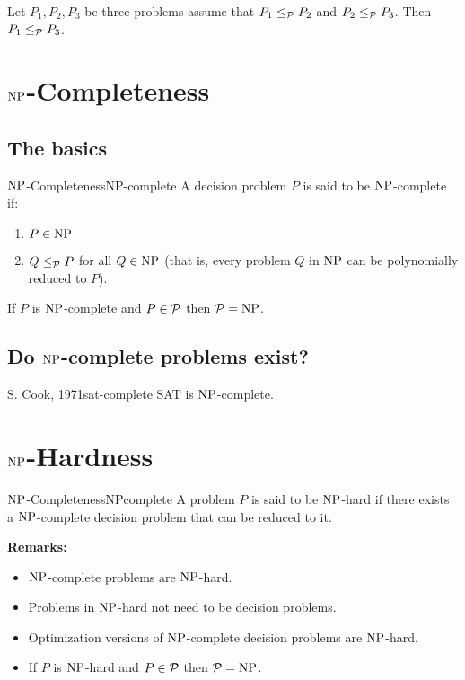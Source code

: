 \begin{proposition}{}{} Let $P_1,P_2,P_3$ be three problems assume that $P_1\leq_{{\mathcal{P}}}P_2$ and $P_2\leq_{{\mathcal{P}}}P_3$. Then $P_1\leq_{{\mathcal{P}}}P_3$.
\end{proposition}

\section{$\mbox{NP}$-Completeness}
\subsection{The basics}
\begin{definition}{$\mbox{NP}$-Completeness}{NP-complete}
A decision problem $P$ is said to be $\mbox{NP}$-complete if:
\begin{enumerate}
	\item $P\in \mbox{NP}$
	\item $Q\leq_{{\mathcal{P}}}P$ for all $Q\in\mbox{NP}$ (that is, every problem $Q$ in $\mbox{NP}$ can be polynomially reduced to $P$). 
\end{enumerate}
\end{definition}

\begin{proposition}{}{} If $P$ is $\mbox{NP}$-complete and $P\in{\mathcal{P}}$ then ${\mathcal{P}}=\mbox{NP}$.
\end{proposition}
\subsection{Do $\mbox{NP}$-complete problems  exist?}
\begin{theorem}{S. Cook, 1971}{sat-complete}
SAT is $\mbox{NP}$-complete.  
\end{theorem}
\section{$\mbox{NP}$-Hardness}
\begin{definition}{$\mbox{NP}$-Completeness}{NPcomplete}
A problem $P$ is said to be $\mbox{NP}$-hard if there exists a $\mbox{NP}$-complete decision problem that can be reduced to it. 
\end{definition}

{\bf Remarks:}
\begin{itemize}
	\item $\mbox{NP}$-complete problems are $\mbox{NP}$-hard.
	\item Problems in $\mbox{NP}$-hard not need to be decision problems.
	\item Optimization versions of $\mbox{NP}$-complete decision problems are $\mbox{NP}$-hard.
	\item If $P$ is $\mbox{NP}$-hard and $P\in{\mathcal{P}}$ then ${\mathcal{P}}=\mbox{NP}$.
\end{itemize}


